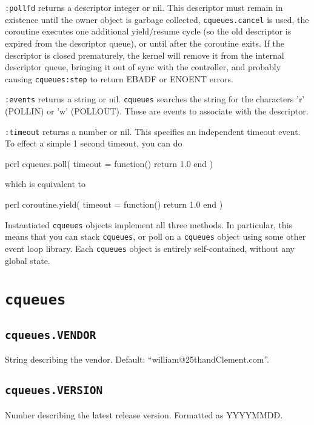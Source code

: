 \documentclass[11pt, oneside]{memoir}
\newcommand*{\cqueues}[0]{\texttt{cqueues}\xspace}
\newcommand*{\routine}[1]{\texttt{#1}\xspace}
\newcommand*{\method}[1]{\texttt{#1}\xspace}
\begin{document}
\method{:pollfd} returns a descriptor integer or nil. This descriptor must remain in existence until the owner object is garbage collected, \routine{cqueues.cancel} is used, the coroutine executes one additional yield/resume cycle (so the old descriptor is expired from the descriptor queue), or until after the coroutine exits. If the descriptor is closed prematurely, the kernel will remove it from the internal descriptor queue, bringing it out of sync with the controller, and probably causing \method{cqueues:step} to return EBADF or ENOENT errors.

\method{:events} returns a string or nil. \cqueues searches the string for the characters 'r' (POLLIN) or 'w' (POLLOUT). These are events to associate with the descriptor.

\method{:timeout} returns a number or nil. This specifies an independent timeout event. To effect a simple 1 second timeout, you can do

\begin{code}{perl}
        cqueues.poll({ timeout = function() return 1.0 end })
\end{code}

which is equivalent to

\begin{code}{perl}
        coroutine.yield({ timeout = function() return 1.0 end })
\end{code}

Instantiated \cqueues objects implement all three methods. In particular, this means that you can stack \cqueues, or poll on a \cqueues object using some other event loop library. Each \cqueues object is entirely self-contained, without any global state.

\section{\cqueues}

\subsection{\routine{cqueues.VENDOR}}
String describing the vendor. Default: ``william@25thandClement.com''.

\subsection{\routine{cqueues.VERSION}}
Number describing the latest release version. Formatted as YYYYMMDD.
\end{document}
